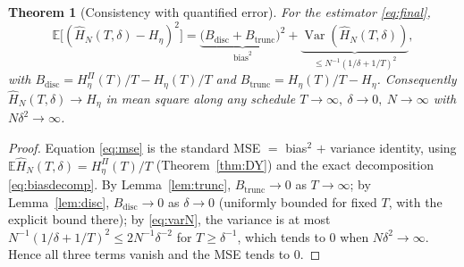 \documentclass{amsart}
\newtheorem{theorem}{Theorem}
\theoremstyle{definition}
\DeclareMathOperator{\Var}{Var}
\newcommand{\E}{\mathbb{E}}
\begin{document}
\begin{theorem}[Consistency with quantified error]\label{thm:main}
For the estimator \eqref{eq:final},
\begin{equation}\label{eq:mse}
   \E\big[(\widehat H_N(T,\delta)-H_\eta)^2\big]
   =\underbrace{\big(B_{\mathrm{disc}}+B_{\mathrm{trunc}}\big)^2}_{\text{bias}^2}
   +\underbrace{\Var(\widehat H_N(T,\delta))}_{\le N^{-1}(1/\delta+1/T)^2},
\end{equation}
with $B_{\mathrm{disc}}=H_\eta^\Pi(T)/T-H_\eta(T)/T$ and
$B_{\mathrm{trunc}}=H_\eta(T)/T-H_\eta$. Consequently
$\widehat H_N(T,\delta)\to H_\eta$ in mean square along any schedule
$T\to\infty,\ \delta\to0,\ N\to\infty$ with $N\delta^2\to\infty$.
\end{theorem}

\begin{proof}
Equation \eqref{eq:mse} is the standard MSE $=$ bias$^2$ $+$ variance identity,
using $\E\widehat H_N(T,\delta)=H_\eta^\Pi(T)/T$ (Theorem~\ref{thm:DY}) and the
exact decomposition \eqref{eq:biasdecomp}. By Lemma~\ref{lem:trunc},
$B_{\mathrm{trunc}}\to0$ as $T\to\infty$; by Lemma~\ref{lem:disc},
$B_{\mathrm{disc}}\to0$ as $\delta\to0$ (uniformly bounded for fixed $T$, with the
explicit bound there); by \eqref{eq:varN}, the variance is at most
$N^{-1}(1/\delta+1/T)^2\le 2N^{-1}\delta^{-2}$ for $T\ge\delta^{-1}$, which tends to
$0$ when $N\delta^2\to\infty$. Hence all three terms vanish and the MSE tends to
$0$.
\end{proof}
\end{document}
